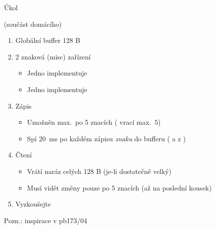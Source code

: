 \begin{frame}{Úkol}

   \iffimuni
    (součást domácího) \fi
  \begin{enumerate}
    \item Globální buffer 128 B

    \item 2 znaková (misc) zařízení
    \begin{itemize}
      \item Jedno implementuje 
      \item Jedno implementuje 
    \end{itemize}

    \item Zápis
    \begin{itemize}
      \item Umožněn max.\ po 5 znacích ( vrací max.\ 5)
      \item Spí 20~ms po každém zápisu \emph{znaku} do bufferu (
        a  z )
    \end{itemize}

    \item Čtení
    \begin{itemize}
      \item Vrátí naráz celých 128 B (je-li  dostatečně velký)
      \item Musí vidět změny pouze po 5 znacích (až na poslední kousek)
    \end{itemize}

    \item Vyzkoušejte
  \end{enumerate}

  \medskip

  Pozn.: inspirace v pb173/04\\

\end{frame}

